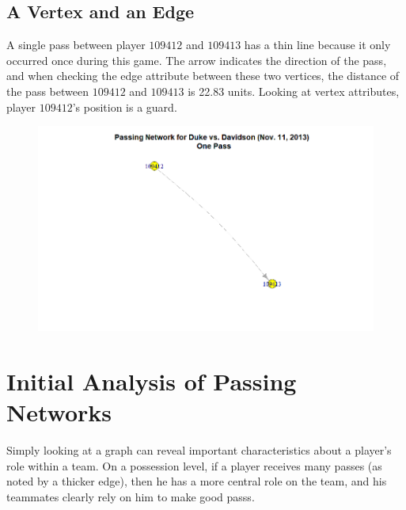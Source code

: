\documentclass[12pt,twoside]{dukestatscithesis}
\theoremstyle{definition}
\theoremstyle{definition}
\theoremstyle{definition}
\theoremstyle{remark}
\begin{document}
\subsection{A Vertex and an Edge}\label{a-vertex-and-an-edge}

A single pass between player \(109412\) and \(109413\) has a thin line
because it only occurred once during this game. The arrow indicates the
direction of the pass, and when checking the edge attribute between
these two vertices, the distance of the pass between \(109412\) and
\(109413\) is 22.83 units. Looking at vertex attributes, player
\(109412\)'s position is a guard.
\begin{figure}
\centering
\includegraphics{img/passnetwork_ex.png}
\caption{}
\end{figure}
\section{Initial Analysis of Passing
Networks}\label{initial-analysis-of-passing-networks}

Simply looking at a graph can reveal important characteristics about a
player's role within a team. On a possession level, if a player receives
many passes (as noted by a thicker edge), then he has a more central
role on the team, and his teammates clearly rely on him to make good
passs.
\end{document}
